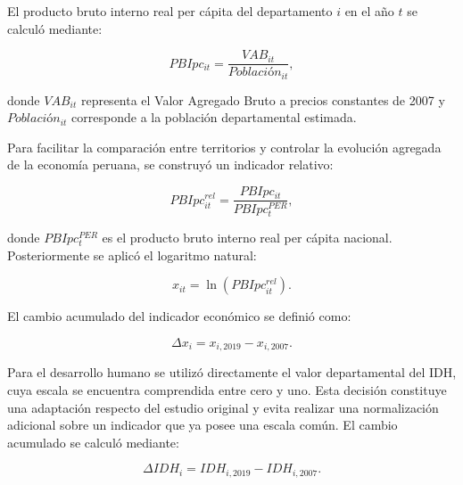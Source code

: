 El producto bruto interno real per cápita del departamento $i$ en el año $t$
se calculó mediante:

\begin{equation}
PBIpc_{it}
=
\frac{VAB_{it}}{Población_{it}},
\label{eq:pbipc}
\end{equation}

donde $VAB_{it}$ representa el Valor Agregado Bruto a precios constantes de
2007 y $Población_{it}$ corresponde a la población departamental estimada.

Para facilitar la comparación entre territorios y controlar la evolución
agregada de la economía peruana, se construyó un indicador relativo:

\begin{equation}
PBIpc^{rel}_{it}
=
\frac{PBIpc_{it}}{PBIpc^{PER}_{t}},
\label{eq:pbipc_relativo}
\end{equation}

donde $PBIpc^{PER}_{t}$ es el producto bruto interno real per cápita nacional.
Posteriormente se aplicó el logaritmo natural:

\begin{equation}
x_{it}
=
\ln\left(PBIpc^{rel}_{it}\right).
\label{eq:log_pbipc}
\end{equation}

El cambio acumulado del indicador económico se definió como:

\begin{equation}
\Delta x_i
=
x_{i,2019}-x_{i,2007}.
\label{eq:cambio_pbi}
\end{equation}

Para el desarrollo humano se utilizó directamente el valor departamental del
IDH, cuya escala se encuentra comprendida entre cero y uno. Esta decisión
constituye una adaptación respecto del estudio original y evita realizar una
normalización adicional sobre un indicador que ya posee una escala común. El
cambio acumulado se calculó mediante:

\begin{equation}
\Delta IDH_i
=
IDH_{i,2019}-IDH_{i,2007}.
\label{eq:cambio_idh}
\end{equation}

